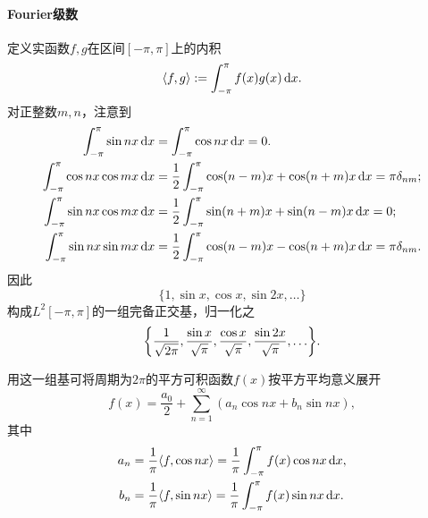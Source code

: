 \paragraph{Fourier级数}
定义实函数$f,g$在区间$[-\pi,\pi]$上的内积
\begin{equation}
	\label{eq:mmp-fourier-inner-product}
	\langle f,g\rangle := \int_{-\pi}^\pi f(x)g(x)\mathop{}\!\mathrm{d} x.
\end{equation}
对正整数$m,n$，注意到
\begin{subequations}
	\label{eqn:intsincos}
	\begin{align}
		\int_{-\pi}^\pi\sin nx\d x &= \int_{-\pi}^\pi\cos nx\d x = 0.\\
		\int_{-\pi}^\pi\cos nx\cos mx\d x & = \frac12\int_{-\pi}^\pi\cos(n - m)x + \cos(n + m)x\d x = \pi\delta_{nm};\\
		\int_{-\pi}^\pi\sin nx\cos mx\d x & = \frac12\int_{-\pi}^\pi\sin(n + m)x + \sin(n - m)x\d x = 0; \\
		\int_{-\pi}^\pi\sin nx\sin mx\d x & = \frac12\int_{-\pi}^\pi\cos(n - m)x - \cos(n + m)x\d x = \pi\delta_{nm} .
	\end{align}
\end{subequations}
因此
\[\{1,\sin x,\cos x,\sin2x,\ldots\}\]
构成$L^2[-\pi,\pi]$的一组完备正交基，归一化之
\begin{equation}
	\label{eq:mmp-trigonometric-orthonormal-basis}
	\biggl\{\frac1{\sqrt{2\pi}},\frac{\sin x}{\sqrt\pi},\frac{\cos x}{\sqrt\pi},\frac{\sin2x}{\sqrt\pi},\ldots\biggr\}.
\end{equation}

用这一组基可将周期为$2\pi$的平方可积函数$f(x)$按平方平均意义展开
\begin{equation}
	\label{eq:mmp-trigonometric-fourier-series}
	f(x) = \frac{a_0}2 + \sum_{n=1}^\infty(a_n\cos nx + b_n\sin nx),
\end{equation}
其中
\begin{subequations}
	\label{eq:mmp-trigonometric-fourier-coefficients}
	\begin{align}
		a_n & = \frac1\pi\langle f,\cos nx\rangle = \frac1\pi\int_{-\pi}^\pi f(x)\cos nx\mathop{}\!\mathrm{d} x, \\
		b_n & = \frac1\pi\langle f,\sin nx\rangle = \frac1\pi\int_{-\pi}^\pi f(x)\sin nx\mathop{}\!\mathrm{d} x.
	\end{align}
\end{subequations}

